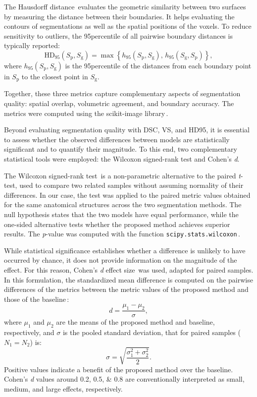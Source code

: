 The Hausdorff distance\,\cite{Hausdorff1991, FeTA2021_review} evaluates the geometric similarity between two surfaces by measuring the distance between their boundaries. It helps evaluating the contours of segmentations as well as the spatial positions of the voxels. To reduce sensitivity to outliers, the 95\th percentile of all pairwise boundary distances is typically reported:
\begin{equation}
    \text{HD}_{95}(S_\text{p}, S_\text{g}) = \max \left\{ h_{95}(S_\text{p}, S_\text{g}), \, h_{95}(S_\text{g}, S_\text{p}) \right\},
\end{equation}
where $h_{95}(S_\text{p}, S_\text{g})$ is the 95\th percentile of the distances from each boundary point in $S_\text{p}$ to the closest point in $S_\text{g}$.

Together, these three metrics capture complementary aspects of segmentation quality: spatial overlap, volumetric agreement, and boundary accuracy. The metrics were computed using the scikit-image library\,\cite{Walt2014, scikit-image}.

Beyond evaluating segmentation quality with DSC, VS, and HD95, it is essential to assess whether the observed differences between models are statistically significant and to quantify their magnitude. To this end, two complementary statistical tools were employed: the Wilcoxon signed-rank test and Cohen's \textit{d}.

The Wilcoxon signed-rank test\,\cite{Wilcoxon1945} is a non-parametric alternative to the paired \textit{t}-test, used to compare two related samples without assuming normality of their differences. In our case, the test was applied to the paired metric values obtained for the same anatomical structures across the two segmentation methods. The null hypothesis states that the two models have equal performance, while the one-sided alternative tests whether the proposed method achieves superior results. The \textit{p}-value was computed with the function \verb|scipy.stats.wilcoxon|\,\cite{SciPy}.

While statistical significance establishes whether a difference is unlikely to have occurred by chance, it does not provide information on the magnitude of the effect. For this reason, Cohen's \textit{d} effect size\,\cite{Cohen2013} was used, adapted for paired samples. In this formulation, the standardized mean difference is computed on the pairwise differences of the metrics between the metric values of the proposed method and those of the baseline\,\cite{effect_size}:
\begin{equation}
    d = \frac{\mu_1-\mu_2}{\sigma},
\end{equation}
where $\mu_1$ and $\mu_2$ are the means of the proposed method and baseline, respectively, and $\sigma$ is the pooled standard deviation, that for paired samples ($N_1 = N_2$) is:
\begin{equation}
    \sigma = \sqrt{\frac{\sigma_1^2+\sigma_2^2}{2}}.
\end{equation}
Positive values indicate a benefit of the proposed method over the baseline. Cohen's \textit{d} values around \numlist{0.2; 0.5; 0.8} are conventionally interpreted as small, medium, and large effects, respectively.

